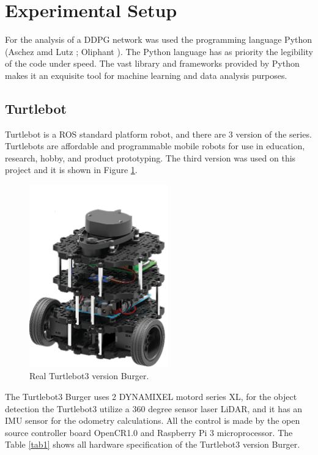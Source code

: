 \section*{Experimental Setup}

For the analysis of a DDPG network was used the programming language Python (Aschez amd Lutz \citeyear{ascher1999learning}; Oliphant \citeyear{oliphant2007python}). 
The Python language has as priority the legibility of the code under speed. 
The vast library and frameworks provided by Python makes it an exquisite tool for machine learning and data analysis purposes.

\subsection*{Turtlebot}

Turtlebot is a ROS standard platform robot, and there are 3 version of the series. Turtlebots are affordable and programmable mobile robots for use in education, research, hobby, and product prototyping.
The third version was used on this project and it is shown in {\color{blue}Figure} \ref{fig:turtlebot3}.

\begin{figure}[H]
\centerline{\includegraphics[width=6cm]{images/burger_real.png}}
\caption{Real Turtlebot3 version Burger.}
\label{fig:turtlebot3}
\end{figure}

The Turtlebot3 Burger uses 2 DYNAMIXEL motord series XL, for the object detection the Turtlebot3 utilize a 360 degree sensor laser LiDAR, and it has an IMU sensor for the odometry calculations.
All the control is made by the open source controller board OpenCR1.0 and Raspberry Pi 3 microprocessor.
The {\color{blue}Table} \ref{tab1} shows all hardware specification of the Turtlebot3 version Burger.


